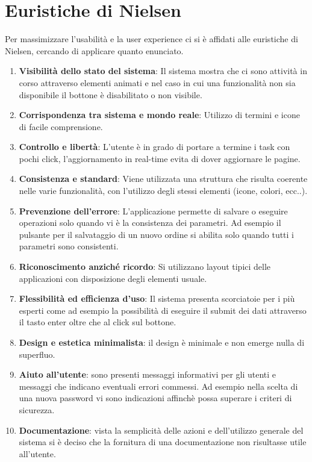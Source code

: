\documentclass[italian]{report}
\begin{document}
\section{Euristiche di Nielsen}
Per massimizzare l'usabilità e la user experience ci si è affidati alle euristiche di Nielsen, cercando di applicare quanto enunciato.
\begin{enumerate}
    \item \textbf{Visibilità dello stato del sistema}: Il sistema mostra che ci sono attività in corso attraverso elementi animati e nel caso in cui una funzionalità non sia disponibile il bottone è disabilitato o non visibile.
    \item \textbf{Corrispondenza tra sistema e mondo reale}: Utilizzo di termini e icone di facile comprensione.
    \item \textbf{Controllo e libertà}: L'utente è in grado di portare a termine i task con pochi click, l'aggiornamento in real-time evita di dover aggiornare le pagine. 
    \item \textbf{Consistenza e standard}: Viene utilizzata una struttura che risulta coerente nelle varie funzionalità, con l'utilizzo degli stessi elementi (icone, colori, ecc..).
    \item \textbf{Prevenzione dell’errore}: L'applicazione permette di salvare o eseguire operazioni solo quando vi è la consistenza dei parametri. Ad esempio il pulsante per il salvataggio di un nuovo ordine si abilita solo quando tutti i parametri sono consistenti.
    \item \textbf{Riconoscimento anziché ricordo}: Si utilizzano layout tipici delle applicazioni con disposizione degli elementi usuale.
    \item \textbf{Flessibilità ed efficienza d’uso}: Il sistema presenta scorciatoie per i più esperti come ad esempio la possibilità di eseguire il submit dei dati attraverso il tasto enter oltre che al click sul bottone.
    \item \textbf{Design e estetica minimalista}: il design è minimale e non emerge nulla di superfluo.
    \item \textbf{Aiuto all’utente}: sono presenti messaggi informativi per gli utenti e messaggi che indicano eventuali errori commessi. Ad esempio nella scelta di una nuova password vi sono indicazioni affinchè possa superare i criteri di sicurezza.
    \item \textbf{Documentazione}: vista la semplicità delle azioni e dell’utilizzo generale del sistema si è deciso che la fornitura di una documentazione non risultasse utile all’utente.
\end{enumerate}
\end{document}

